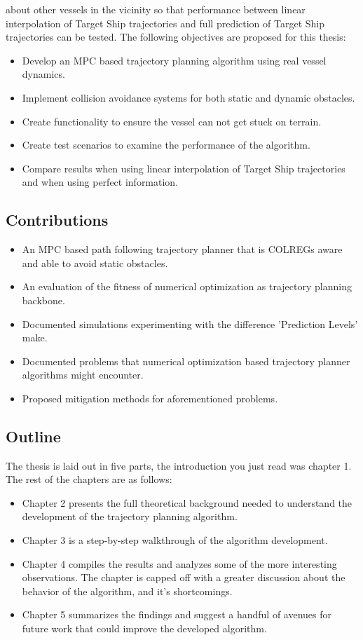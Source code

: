 about other vessels in the vicinity so that performance between linear interpolation of Target Ship trajectories
and full prediction of Target Ship trajectories can be tested.
The following objectives are proposed for this thesis:
\begin{itemize}
    \item Develop an MPC based trajectory planning algorithm using real vessel dynamics.
    \item Implement collision avoidance systems for both static and dynamic obstacles.
    \item Create functionality to ensure the vessel can not get stuck on terrain.
    \item Create test scenarios to examine the performance of the algorithm.
    \item Compare results when using linear interpolation of Target Ship trajectories and when using perfect information.
\end{itemize}


\subsection{Contributions}
\begin{itemize}
    \item An MPC based path following trajectory planner that is COLREGs aware and able to avoid static obstacles.
    \item An evaluation of the fitness of numerical optimization as trajectory planning backbone.
    \item Documented simulations experimenting with the difference 'Prediction Levels' make.
    \item Documented problems that numerical optimization based trajectory planner algorithms might encounter.
    \item Proposed mitigation methods for aforementioned problems.
\end{itemize}

\subsection{Outline}
The thesis is laid out in five parts, the introduction you just read was chapter 1. The rest of the chapters are as follows:
\begin{itemize}
    \item Chapter 2 presents the full theoretical background needed to understand the development of the trajectory planning algorithm.
    \item Chapter 3 is a step-by-step walkthrough of the algorithm development.
    \item Chapter 4 compiles the results and analyzes some of the more interesting observations. The chapter is capped off with a greater
    discussion about the behavior of the algorithm, and it's shortcomings.
    \item Chapter 5 summarizes the findings and suggest a handful of avenues for future work that could improve the developed algorithm.
\end{itemize}


\newpage